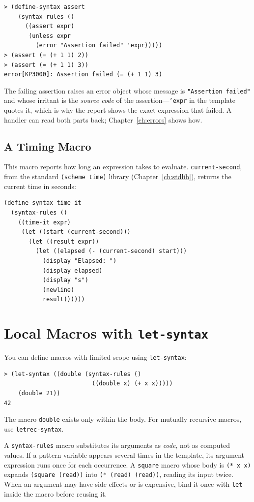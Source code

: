 \begin{lstlisting}[style=repl]
> (define-syntax assert
    (syntax-rules ()
      ((assert expr)
       (unless expr
         (error "Assertion failed" 'expr)))))
> (assert (= (+ 1 1) 2))
> (assert (= (+ 1 1) 3))
error[KP3000]: Assertion failed (= (+ 1 1) 3)
\end{lstlisting}

The failing assertion raises an error object whose message is \texttt{"Assertion failed"} and whose irritant is the \emph{source code} of the assertion---\texttt{'expr} in the template quotes it, which is why the report shows the exact expression that failed. A handler can read both parts back; Chapter~\ref{ch:errors} shows how.

\subsection{A Timing Macro}

This macro reports how long an expression takes to evaluate. \texttt{current-second}, from the standard \texttt{(scheme time)} library (Chapter~\ref{ch:stdlib}), returns the current time in seconds:

\begin{lstlisting}
(define-syntax time-it
  (syntax-rules ()
    ((time-it expr)
     (let ((start (current-second)))
       (let ((result expr))
         (let ((elapsed (- (current-second) start)))
           (display "Elapsed: ")
           (display elapsed)
           (display "s")
           (newline)
           result))))))
\end{lstlisting}

\section{Local Macros with \texttt{let-syntax}}

You can define macros with limited scope using \texttt{let-syntax}:

\begin{lstlisting}[style=repl]
> (let-syntax ((double (syntax-rules ()
                         ((double x) (+ x x)))))
    (double 21))
42
\end{lstlisting}

The macro \texttt{double} exists only within the body. For mutually recursive macros, use \texttt{letrec-syntax}.

\begin{warning}
A \texttt{syntax-rules} macro substitutes its arguments as \emph{code}, not as computed values. If a pattern variable appears several times in the template, its argument expression runs once for each occurrence. A \texttt{square} macro whose body is \texttt{(* x x)} expands \texttt{(square (read))} into \texttt{(* (read) (read))}, reading its input twice. When an argument may have side effects or is expensive, bind it once with \texttt{let} inside the macro before reusing it.
\end{warning}

